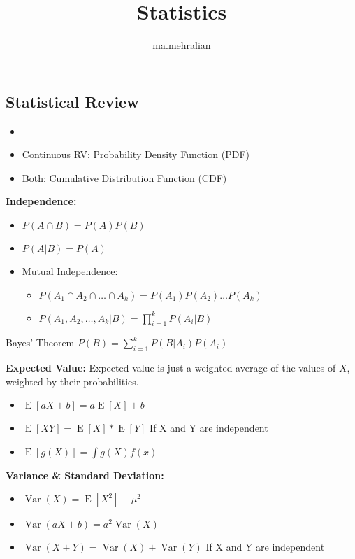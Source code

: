 \documentclass{../cheat}
\title{Statistics}
\author{ma.mehralian}
\begin{document}
\begin{multicols}{3}
	\section{Statistical Review}
	
	\begin{itemize}
		\item 
		\item Continuous RV: Probability Density Function (PDF)
		\item Both: Cumulative Distribution Function (CDF)
	\end{itemize}
	
	\textbf{Independence:}
	\begin{itemize}
		\item $P(A \cap B) = P(A) P(B)$
		\item $P(A|B) = P(A)$
		\item Mutual Independence: 
		\begin{itemize}
			\item $P(A_1 \cap A_2 \cap  \ldots \cap A_k ) = P(A_1) P(A_2) \ldots P(A_k)$
			\item $P(A_1, A_2, \ldots ,A_k | B ) = \prod_{i=1}^k P(A_i|B)$
		\end{itemize}
	\end{itemize}
	Bayes' Theorem 
	$P(B)=\sum^{k}_{i=1} P(B|A_i)P(A_i)$
	
	
	

	\textbf{Expected Value:}
	Expected value is just a weighted average of the values of $X$, weighted by their probabilities.

			\setlength{\gapspace}{0.5\columnwidth}
	\begin{itemize}[nolistsep, leftmargin=1em]
		\item {}
				$\operatorname{E}[aX+ b]= a \operatorname{E}[X]+ b$
		\item $\operatorname{E}[XY]= \operatorname{E}[X ]* \operatorname{E}[Y]$ If X and Y are independent
		\item $\operatorname{E}[g(X)]=\int g(X) f(x)$
	\end{itemize}
	
	\textbf{Variance \& Standard Deviation:}
	\begin{itemize}[nolistsep, leftmargin=1em]
		\item {}
			$\operatorname{Var}(X) = \operatorname{E}\left[X^2 \right] - \mu^2$
		\item {}
				$ \operatorname{Var}(aX+ b)= a^2  \operatorname{Var}(X)$
		\item $ \operatorname{Var}(X \pm Y)=  \operatorname{Var}(X)+ \operatorname{Var}(Y)$ If X and Y are independent
	\end{itemize}
	

\end{multicols}
\end{document}
